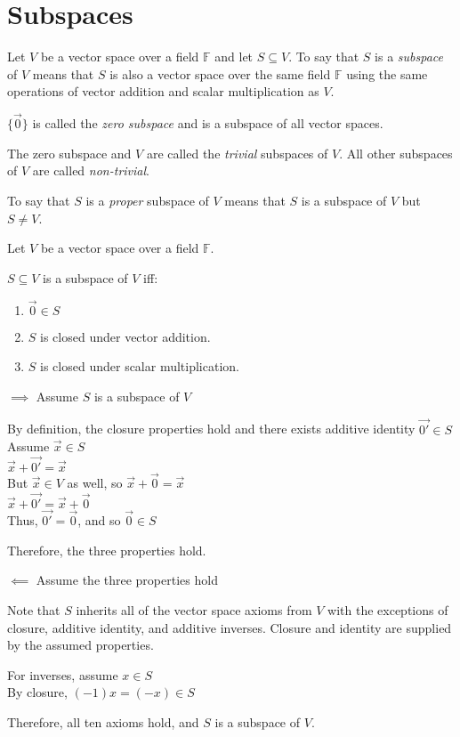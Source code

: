 \documentclass[letterpaper,12pt,fleqn]{article}
\newcommand{\F}{\mathbb{F}}
\newcommand{\vx}{\vec{x}}
\newcommand{\vz}{\vec{0}}
\newcommand{\vzp}{\vec{0'}}
\begin{document}
\section*{Subspaces}
  
\begin{definition}[Subspace]
  Let $V$ be a vector space over a field $\F$ and let $S\subseteq V$. To say
  that $S$ is a \emph{subspace} of $V$ means that $S$ is also a vector space
  over the same field $\F$ using the same operations of vector addition and
  scalar multiplication as $V$.

  $\{\vz\}$ is called the \emph{zero subspace} and is a subspace of all
  vector spaces.
  
  The zero subspace and $V$ are called the \emph{trivial} subspaces of $V$. All
  other subspaces of $V$ are called \emph{non-trivial}.

  To say that $S$ is a \emph{proper} subspace of $V$ means that $S$ is a
  subspace of $V$ but $S\ne V$.
\end{definition}

\begin{theorem}
  Let $V$ be a vector space over a field $\F$.

  $S\subseteq V$ is a subspace of $V$ iff:
  \begin{enumerate}
  \item $\vz\in S$
  \item $S$ is closed under vector addition.
  \item $S$ is closed under scalar multiplication.
  \end{enumerate}
\end{theorem}

\begin{theproof}
  \listbreak
  \begin{description}
  \item $\implies$ Assume $S$ is a subspace of $V$

    By definition, the closure properties hold and there exists additive
    identity $\vzp\in S$ \\
    Assume $\vx\in S$ \\
    $\vx+\vzp=\vx$ \\
    But $\vx\in V$ as well, so $\vx+\vz=\vx$ \\
    $\vx+\vzp=\vx+\vz$ \\
    Thus, $\vzp=\vz$, and so $\vz\in S$

    Therefore, the three properties hold.

  \item $\impliedby$ Assume the three properties hold

    Note that $S$ inherits all of the vector space axioms from $V$ with the
    exceptions of closure, additive identity, and additive inverses. Closure and
    identity are supplied by the assumed properties.

    For inverses, assume $x\in S$ \\
    By closure, $(-1)x=(-x)\in S$

    Therefore, all ten axioms hold, and $S$ is a subspace of $V$.
  \end{description}
\end{theproof}
\end{document}
